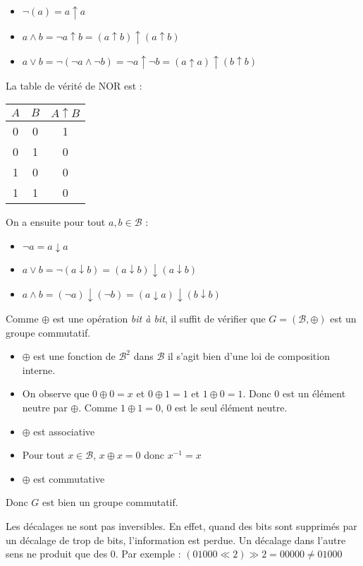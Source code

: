 \documentclass[../main.tex]{subfiles}
\begin{document}
\begin{itemize}
	\item $\neg(a) = a\uparrow{a}$
	\item $a\wedge b = \neg{a\uparrow{b}} = (a\uparrow{b})\uparrow(a\uparrow{b})$
	\item $a\vee b = \neg{(\neg a \wedge \neg{b})} = \neg{a}\uparrow\neg{b} = (a\uparrow a) \uparrow (b\uparrow b)$
\end{itemize}
La table de vérité de NOR est :
\begin{center}
\begin{tabular}{c|c|c}
$A$ & $B$ & $A\uparrow{B}$ \\
\hline
0 & 0 & 1 \\
0 & 1 & 0 \\
1 & 0 & 0 \\
1 & 1 & 0 \\
\end{tabular}
\end{center}
On a ensuite pour tout $a, b\in{\mathcal{B}}$ :
\begin{itemize}
	\item $\neg a = a\downarrow a$
	\item $a \vee b = \neg{(a \downarrow b)} = (a\downarrow b) \downarrow (a\downarrow b)$
	\item $a\wedge b = (\neg a)\downarrow (\neg b) = (a\downarrow a) \downarrow (b\downarrow b)$
\end{itemize}
 Comme $\oplus$ est une opération \textit{bit à bit}, il suffit de vérifier que $G = (\mathcal{B}, \oplus)$ est un groupe commutatif.
\begin{itemize}
	\item $\oplus$ est une fonction de $\mathcal{B}^{2}$ dans $\mathcal{B}$ il s'agit bien d'une loi de composition interne.
	\item On observe que $0\oplus0 = x$ et $0\oplus 1 = 1$ et $1\oplus 0 = 1$. Donc $0$ est un élément neutre par $\oplus$. Comme $1\oplus1 = 0$, 0 est le seul élément neutre.
	\item $\oplus$ est associative
	\item Pour tout $x\in{\mathcal{B}}$, $x\oplus x = 0$ donc $x^{-1} = x$
	\item $\oplus$ est commutative
\end{itemize}
Donc $G$ est bien un groupe commutatif.

 Les décalages ne sont pas inversibles. En effet, quand des bits sont supprimés par un décalage de trop de bits, l'information est perdue. Un décalage dans l'autre sens ne produit que des 0. Par exemple : $(01000 \ll 2) \gg 2 = 00000 \neq 01000$
\end{document}
